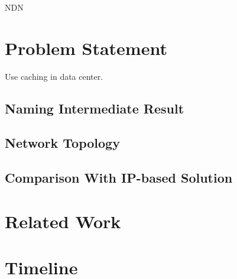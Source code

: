 \documentclass[journal]{IEEEtran}
\begin{document}
NDN 


\section{Problem Statement}
Use caching in data center.
\subsection{Naming Intermediate Result}
\subsection{Network Topology}
\subsection{Comparison With IP-based Solution}
\section{Related Work}
\section{Timeline}




\end{document}
